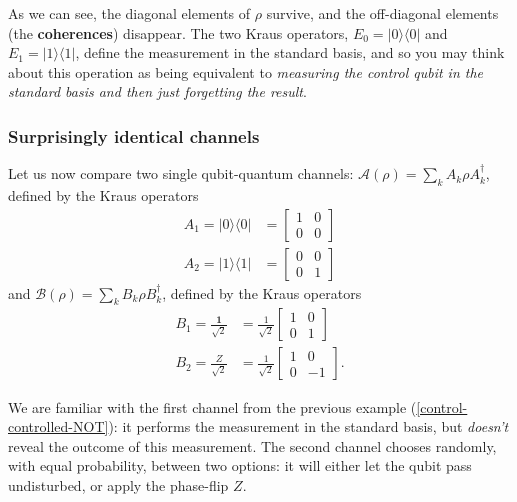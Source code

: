 \documentclass[fleqn,a4paper]{article}
\theoremstyle{definition}
\theoremstyle{definition}
\theoremstyle{definition}
\theoremstyle{definition}
\theoremstyle{remark}
\begin{document}
As we can see, the diagonal elements of \(\rho\) survive, and the off-diagonal elements (the \textbf{coherences}) disappear.
The two Kraus operators, \(E_0=|0\rangle\langle 0|\) and \(E_1=|1\rangle\langle 1|\), define the measurement in the standard basis, and so you may think about this operation as being equivalent to \emph{measuring the control qubit in the standard basis and then just forgetting the result}.

\hypertarget{surprisingly-identical-channels}{%
\subsubsection{Surprisingly identical channels}\label{surprisingly-identical-channels}}

Let us now compare two single qubit-quantum channels: \(\mathcal{A}(\rho)=\sum_k A_k\rho A^\dagger_k\), defined by the Kraus operators
\[
  \begin{aligned}
    A_1 = |0\rangle\langle 0|
    &= \begin{bmatrix}1&0\\0&0\end{bmatrix}
  \\A_2 = |1\rangle\langle 1|
  &= \begin{bmatrix}0&0\\0&1\end{bmatrix}
  \end{aligned}
\]
and \(\mathcal{B}(\rho)=\sum_k B_k\rho B^\dagger_k\), defined by the Kraus operators
\[
  \begin{aligned}
    B_1 = \frac{\mathbf{1}}{\sqrt{2}}
    &= \frac{1}{\sqrt{2}}\begin{bmatrix}1&0\\0&1\end{bmatrix}
  \\B_2 = \frac{Z}{\sqrt{2}}
    &= \frac{1}{\sqrt{2}}\begin{bmatrix}1&0\\0&-1\end{bmatrix}.
  \end{aligned}
\]

We are familiar with the first channel from the previous example (\ref{control-controlled-NOT}): it performs the measurement in the standard basis, but \emph{doesn't} reveal the outcome of this measurement.
The second channel chooses randomly, with equal probability, between two options: it will either let the qubit pass undisturbed, or apply the phase-flip \(Z\).
\end{document}
